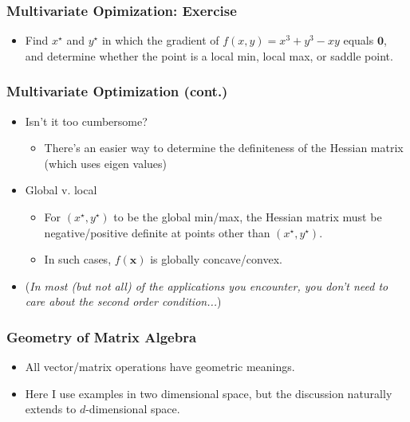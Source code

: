 \documentclass[pdflatex, 12pt]{beamer}
\begin{document}
\begin{frame}
\frametitle{Multivariate Opimization: Exercise}
\begin{itemize}
\item Find $x^{\star}$ and $y^{\star}$ in which the gradient of $f(x, y) = x^3 + y^3 - xy$ equals $\bm{0}$, and determine whether the point is a local min, local max, or saddle point. 
\end{itemize}
\end{frame}

\begin{frame}
\frametitle{Multivariate Optimization (cont.)}
\begin{itemize}
\item Isn't it too cumbersome?
 \begin{itemize}
 \item There's an easier way to determine the definiteness of the Hessian matrix (which uses eigen values)
 \end{itemize}
\vspace{0.4cm}
\item Global v. local
 \begin{itemize}
 \item For $(x^{\star}, y^{\star})$ to be the global min/max, the Hessian matrix must be negative/positive definite at points other than $(x^{\star}, y^{\star})$.
 \item In such cases, $f(\bm{x})$ is globally concave/convex. 
 \end{itemize}
\vspace{0.4cm}
\item (\emph{In most (but not all) of the applications you encounter, you don't need to care about the second order condition...})
\end{itemize}
\end{frame}

\begin{frame}
\frametitle{Geometry of Matrix Algebra}
\begin{itemize}
\item All vector/matrix operations have geometric meanings.
\vspace{0.4cm}
\item Here I use examples in two dimensional space, but the discussion naturally extends to $d$-dimensional space. 
\end{itemize}
\end{frame}
\end{document}
